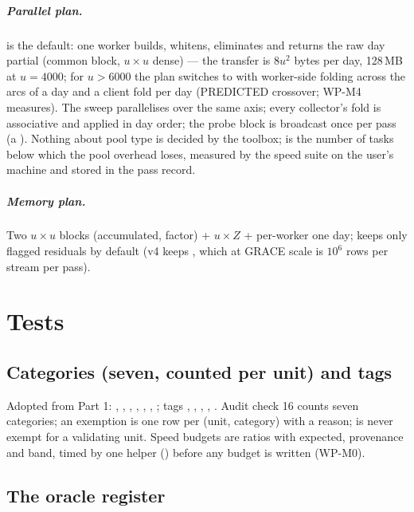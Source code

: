 \paragraph{Parallel plan.}  is the default: one worker builds, whitens, eliminates and returns the raw day partial (common block, $u\times u$ dense) --- the transfer is $8u^2$ bytes per day, 128\,MB at $u=4000$; for $u > 6000$ the plan switches to  with worker-side folding across the arcs of a day and a client fold per day (PREDICTED crossover; WP-M4 measures). The sweep parallelises over the same axis; every collector's fold is associative and applied in day order; the probe block is broadcast once per pass (a ). Nothing about pool type is decided by the toolbox;  is the number of tasks below which the pool overhead loses, measured by the speed suite on the user's machine and stored in the pass record.

\paragraph{Memory plan.} Two $u\times u$ blocks (accumulated, factor) + $u\times Z$ + per-worker one day;  keeps only flagged residuals by default (v4 keeps , which at GRACE scale is $10^6$ rows per stream per pass).

\chapter{Tests}
\label{ch:tests}

\section{Categories (seven, counted per unit) and tags}

Adopted from  Part 1: , , , , , , ; tags , , , , . Audit check 16 counts seven categories; an exemption is one row per (unit, category) with a reason;  is never exempt for a validating unit. Speed budgets are ratios with expected, provenance and band, timed by one helper () before any budget is written (WP-M0).

\section{The oracle register}

